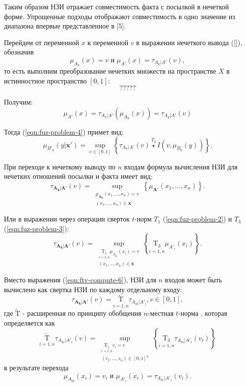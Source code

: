 Таким образом НЗИ отражает совместимость факта с посылкой в нечеткой форме. Упрощенные подходы отображают совместимость в одно значение из диапазона впервые представленное в [5].

Перейдем от переменной $x$ к переменной $v$ в выражении нечеткого вывода (\ref{}), обозначив
\[
\mu_{A_k}(x) = v \textrm{ и } \mu_{A'}(x) = \tau_{A_k|A'}(v),
\]
то есть выполним преобразование нечетких множеств на пространстве $X$ в истинностное пространство $[0, 1]$:
\[
?????
\]

Получим:
\begin{equation}
\label{eqn:ftv-compute-4}
\mu_{A'}(x) = \tau_{A_k|A'}(\mu_{A_k}(x)) = \tau_{A_k|A'}(v)
\end{equation}

Тогда (\ref{eqn:fuz-problem-4}) примет вид:
\begin{equation}
\label{eqn:ftv-compute-5}
\mu_{B'_k}(y|\mathbf{x'}) = \sup_{v \in [0,1]}\left\{\tau_{A_k|A'}(v) \overset{T_2}{\star} I(v, \mu_{B_k}(y))\right\}.
\end{equation}

При переходе к нечеткому выводу по $n$ входам формула вычисления НЗИ для нечетких отношений посылки и факта имеет вид:
\begin{equation*}
\tau_{\mathbf{A_k}|\mathbf{A'}}(v) = \sup_{\substack{\mu_{\mathbf{A_k}}(x_1, \dots, x_n) = v \\ (x_1, \dots, x_n) \in \mathbf{x}}} \left\{\mu_{\mathbf{A'}}(x_1, \dots, x_n)\right\} .
\end{equation*}

Или в выражении через операции сверток $t$-норм $T_1$ (\ref{eqn:fuz-problem-2}) и $T_3$ (\ref{eqn:fuz-problem-3}):
\begin{equation}
\label{eqn:ftv-compute-6}
\tau_{\mathbf{A_k}|\mathbf{A'}}(v) = \sup_{\substack{\underset{i=\overline{1,n}}{\mathrm{T_1}}\mu_{A_{ki}}(x_i)=v \\ (x_1, \dots, x_n) \in \mathbf{x}}} \left\{ \underset{i=\overline{1,n}}{\mathrm{T_3}} \mu_{A'_i}(x_i) \right\}.
\end{equation}

Вместо выражения (\ref{eqn:ftv-compute-6}), НЗИ для $n$ входов может быть вычислено как свертка НЗИ по каждому отдельному входу:
\begin{equation}
\label{eqn:ftv-compute-7}
\tau_{\mathbf{A_k}|\mathbf{A'}}(v) = \underset{i=\overline{1,n}}{\mathrm{\tilde{T}}} \tau_{A_{ki}|A'_i}, v \in [0, 1],
\end{equation}
где $\mathrm{\tilde{T}}$ - расширенная по принципу обобщения $n$-местная $t$-норма \cite{kutsenko2015methods}, которая определяется как
\begin{equation}
\label{eqn:ftv-compute-8}
\underset{i=\overline{1,n}}{\mathrm{\tilde{T}}} \tau_{A_{ki}|A'_i}(v) = \sup_{\substack{\underset{i=\overline{1,n}}{\mathrm{T_1}}v_i = v \\ (v_1, \dots, v_n) \in [0, 1]^n}} \left\{\underset{i=\overline{1,n}}{\mathrm{T_3}}\tau_{A_{ki}|A'_i}(v_i)\right\}
\end{equation}
в результате перехода
\[
\mu_{A_{ki}}(x_i) = v_i \textrm{ и } \mu_{A'_i}(x_i) = \tau_{A_{ki}|A'_i}(v_i).
\]

